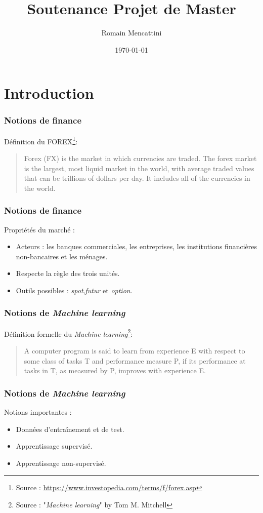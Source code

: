 \documentclass{beamer}
\title{Soutenance Projet de Master}
\author{Romain Mencattini}
\institute{Université de Genève}
\date{\today}
\begin{document}
  \begin{frame}
  \titlepage
  \end{frame}

	\section{Introduction} %
	
	\begin{frame}
		\frametitle{Notions de finance}
		Définition du FOREX\footnote{Source : \url{https://www.investopedia.com/terms/f/forex.asp}}: 
		\begin{quote}
			Forex (FX) is the market in which currencies are traded. The forex market is the largest, most liquid market in the world, with average traded values that can be trillions of dollars per day. It includes all of the currencies in the world.
		\end{quote}
	\end{frame}

	\begin{frame}
	\frametitle{Notions de finance}
	Propriétés du marché :
		\begin{itemize}
			\item Acteurs : les banques commerciales, les entreprises, les institutions financières non-bancaires et les ménages.
			\item Respecte la règle des trois unités.
			\item Outils possibles : \textit{spot},\textit{futur} et \textit{option}.
	\end{itemize}
	\end{frame}

	\begin{frame}
		\frametitle{Notions de \textit{Machine learning}}
		Définition formelle du \textit{Machine learning}\footnote{Source : "\textit{Machine learning}" by Tom M. Mitchell}:
		\begin{quote}
			A computer program is said to learn from experience E with respect to some class of tasks T and performance measure P, if its performance at tasks in T, as measured by P, improves with experience E.
		\end{quote}
	\end{frame}

	\begin{frame}
		\frametitle{Notions de \textit{Machine learning}}
		Notions importantes :
		\begin{itemize}
			\item Données d'entraînement et de test.
			\item Apprentissage supervisé.
			\item Apprentissage non-supervisé.
		\end{itemize}
	\end{frame}
\end{document}
